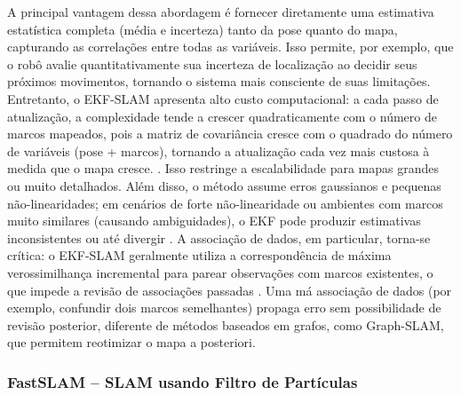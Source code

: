         A principal vantagem dessa abordagem é fornecer diretamente uma estimativa estatística completa (média e incerteza) tanto da pose quanto do mapa, capturando as correlações entre todas as variáveis. Isso permite, por exemplo, que o robô avalie quantitativamente sua incerteza de localização ao decidir seus próximos movimentos, tornando o sistema mais consciente de suas limitações. Entretanto, o EKF-SLAM apresenta alto custo computacional: a cada passo de atualização, a complexidade tende a crescer quadraticamente com o número de marcos mapeados, pois a matriz de covariância cresce com o quadrado do número de variáveis (pose + marcos), tornando a atualização cada vez mais custosa à medida que o mapa cresce. \cite{Thrun2005}. Isso restringe a escalabilidade para mapas grandes ou muito detalhados. Além disso, o método assume erros gaussianos e pequenas não-linearidades; em cenários de forte não-linearidade ou ambientes com marcos muito similares (causando ambiguidades), o EKF pode produzir estimativas inconsistentes ou até divergir \cite{Thrun2005}. A associação de dados, em particular, torna-se crítica: o EKF-SLAM geralmente utiliza a correspondência de máxima verossimilhança incremental para parear observações com marcos existentes, o que impede a revisão de associações passadas \cite{Thrun2005}. Uma má associação de dados (por exemplo, confundir dois marcos semelhantes) propaga erro sem possibilidade de revisão posterior, diferente de métodos baseados em grafos, como Graph-SLAM, que permitem reotimizar o mapa a posteriori. 


        
        \subsubsection{FastSLAM – SLAM usando Filtro de Partículas}
        
